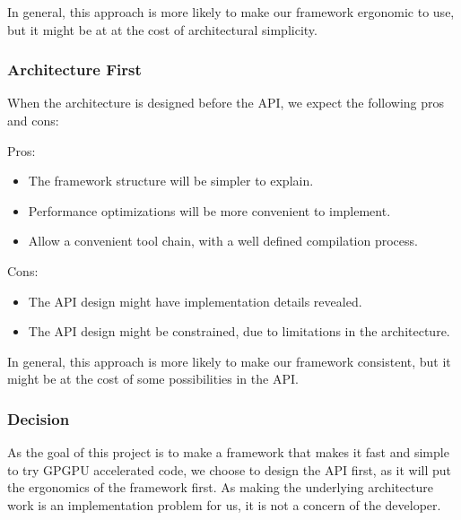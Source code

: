 In general, this approach is more likely to make our framework ergonomic to use, but it might be at at the cost of architectural simplicity. 

\subsubsection{Architecture First}
When the architecture is designed before the API, we expect the following pros and cons:

Pros:
\begin{itemize}
\item The framework structure will be simpler to explain.
\item Performance optimizations will be more convenient to implement.
\item Allow a convenient tool chain, with a well defined compilation process.
\end{itemize}

Cons:
\begin{itemize}
\item The API design might have implementation details revealed.
\item The API design might be constrained, due to limitations in the architecture.
\end{itemize}

In general, this approach is more likely to make our framework consistent, but it might be at the cost of some possibilities in the API. 

%
%

\subsubsection{Decision}
As the goal of this project is to make a framework that makes it fast and simple to try GPGPU accelerated code, we choose to design the API first, as it will put the ergonomics of the framework first. As making the underlying architecture work is an implementation problem for us, it is not a concern of the developer. 